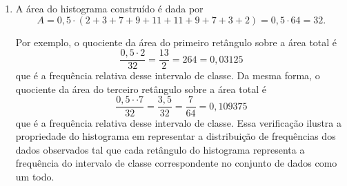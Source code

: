 \documentclass[10 pt,usenames,dvipsnames, oneside]{article}
\begin{document}
\begin{solucao}
\begin{enumerate}
\item A área do histograma construído é dada por $$A=0{,}5\cdot(2+3+7+9+11+11+9+7+3+2)=0{,}5\cdot64=32.$$

Por exemplo, o quociente da área do primeiro retângulo sobre a área total é $$\displaystyle\frac{0{,}5\cdot2}{32}=\frac{13}{2}=264=0,03125$$ que é a frequência relativa desse intervalo de classe. Da mesma forma, o quociente da área do terceiro retângulo sobre a área total é $$\displaystyle\frac{0{,}5⋅\cdot7}{32}=\frac{3{,}5}{32}=\frac{7}{64}=0{,}109375$$ que é a frequência relativa desse intervalo de classe. Essa verificação ilustra a propriedade do histograma em representar a distribuição de frequências dos dados observados tal que cada retângulo do histograma representa a frequência do intervalo de classe correspondente no conjunto de dados como um todo.
\end{enumerate}
\end{solucao}
\fi
\end{document}
